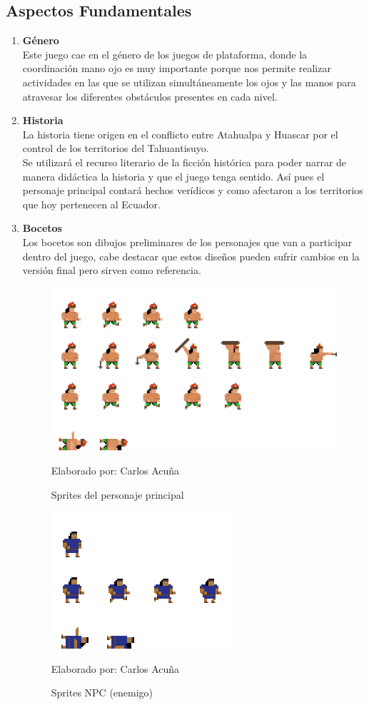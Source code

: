 \documentclass[a4paper, openright, 12pt]{report}
\begin{document}
\subsection*{Aspectos Fundamentales}
\begin{enumerate}
\item \textbf{Género}\\
Este juego cae en el género de los juegos de plataforma, donde la coordinación mano ojo es muy importante porque nos permite realizar actividades en las que se utilizan simultáneamente los ojos y las manos para atravesar los diferentes obstáculos presentes en cada nivel.
\item \textbf{Historia}\\
La historia tiene origen en el conflicto entre Atahualpa y Huascar por el control de los territorios del Tahuantisuyo.\\
Se utilizará el recurso literario de la ficción histórica para poder narrar de manera didáctica la historia y que el juego tenga sentido. Así pues el personaje principal contará hechos verídicos y como afectaron a los territorios que hoy pertenecen al Ecuador.

\item \textbf{Bocetos}\\
Los bocetos son dibujos preliminares de los personajes que van a participar dentro del juego, cabe destacar que estos diseños pueden sufrir cambios en la versión final pero sirven como referencia.

\begin{figure}[h]
\includegraphics[scale=1.5]{player}
\centering
\caption{Sprites del personaje principal}
Elaborado por: Carlos Acuña
\end{figure}

\begin{figure}[h]
\includegraphics[scale=1.5]{enemy_warrior_blue}
\centering
\caption{Sprites NPC (enemigo)}
Elaborado por: Carlos Acuña
\end{figure}


\end{enumerate}
\end{document}
